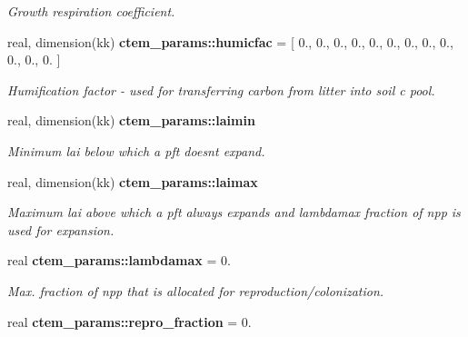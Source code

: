 \begin{DoxyCompactItemize}
\begin{DoxyCompactList}\small\item\em Growth respiration coefficient. \end{DoxyCompactList}\item 
\hypertarget{namespacectem__params_a5c8f0977ee35f251a0c99293d0e91e56}{}real, dimension(kk) {\bfseries ctem\+\_\+params\+::humicfac} = \mbox{[} 0., 0., 0., 0., 0., 0., 0., 0., 0., 0., 0., 0. \mbox{]}\label{namespacectem__params_a5c8f0977ee35f251a0c99293d0e91e56}

\begin{DoxyCompactList}\small\item\em Humification factor -\/ used for transferring carbon from litter into soil c pool. \end{DoxyCompactList}\item 
\hypertarget{namespacectem__params_a7a661dffd51da0f6b8c71a0f71fd2679}{}real, dimension(kk) {\bfseries ctem\+\_\+params\+::laimin}\label{namespacectem__params_a7a661dffd51da0f6b8c71a0f71fd2679}

\begin{DoxyCompactList}\small\item\em Minimum lai below which a pft doesn\textquotesingle{}t expand. \end{DoxyCompactList}\item 
\hypertarget{namespacectem__params_abec8d35477e7996256f26318e666f199}{}real, dimension(kk) {\bfseries ctem\+\_\+params\+::laimax}\label{namespacectem__params_abec8d35477e7996256f26318e666f199}

\begin{DoxyCompactList}\small\item\em Maximum lai above which a pft always expands and lambdamax fraction of npp is used for expansion. \end{DoxyCompactList}\item 
\hypertarget{namespacectem__params_ae7cc598974253bc2df0aeaed4ffea891}{}real {\bfseries ctem\+\_\+params\+::lambdamax} = 0.\label{namespacectem__params_ae7cc598974253bc2df0aeaed4ffea891}

\begin{DoxyCompactList}\small\item\em Max. fraction of npp that is allocated for reproduction/colonization. \end{DoxyCompactList}\item 
\hypertarget{namespacectem__params_a4b02c06a75e1eba7cae5f864b099bb0d}{}real {\bfseries ctem\+\_\+params\+::repro\+\_\+fraction} = 0.\label{namespacectem__params_a4b02c06a75e1eba7cae5f864b099bb0d}


\end{DoxyCompactItemize}
